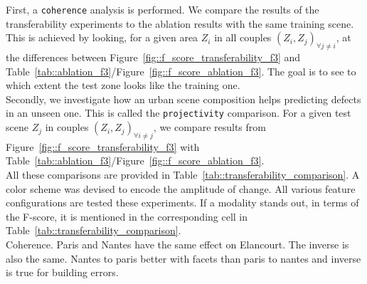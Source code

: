         First, a \texttt{coherence} analysis is performed.
        We compare the results of the transferability experiments to the ablation results with the same training scene.
        This is achieved by looking, for a given area $Z_i$ in all couples $(Z_i, Z_j)_{\forall j \neq i}$, at the differences between Figure~\ref{fig::f_score_transferability_f3} and Table~\ref{tab::ablation_f3}/Figure~\ref{fig::f_score_ablation_f3}.
        The goal is to see to which extent the test zone looks like the training one.\\
        Secondly, we investigate how an urban scene composition helps predicting defects in an unseen one.
        This is called the \texttt{projectivity} comparison.
        For a given test scene $Z_j$ in couples $(Z_i, Z_j)_{\forall i \neq j}$, we compare results from Figure~\ref{fig::f_score_transferability_f3} with Table~\ref{tab::ablation_f3}/Figure~\ref{fig::f_score_ablation_f3}.\\

        All these comparisons are provided in Table~\ref{tab::transferability_comparison}.
        A color scheme was devised to encode the amplitude of change.
        All various feature configurations are tested these experiments.
        If a modality stands out, in terms of the F-score, it is mentioned in the corresponding cell in Table~\ref{tab::transferability_comparison}.\\

        Coherence.
        Paris and Nantes have the same effect on Elancourt.
        The inverse is also the same.
        Nantes  to paris better with facets than paris to nantes and inverse is true for building errors.

